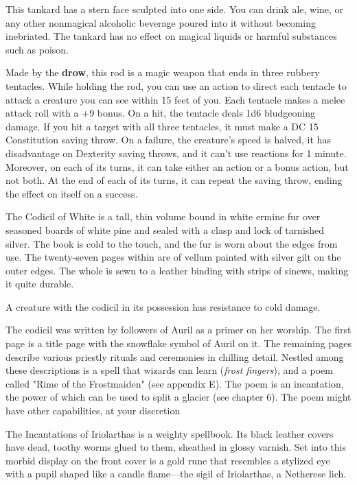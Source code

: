 \documentclass[10pt,a4paper,twoside,bg=print,twocolumn,openany,nodeprecatedcode]{dndbook}
\begin{document}
This tankard has a stern face sculpted into one side. You can drink ale, wine, or any other nonmagical alcoholic beverage poured into it without becoming inebriated. The tankard has no effect on magical liquids or harmful substances such as poison.

Made by the \textbf{drow}, this rod is a magic weapon that ends in three rubbery tentacles. While holding the rod, you can use an action to direct each tentacle to attack a creature you can see within 15 feet of you. Each tentacle makes a melee attack roll with a +9 bonus. On a hit, the tentacle deals 1d6 bludgeoning damage. If you hit a target with all three tentacles, it must make a DC 15 Constitution saving throw. On a failure, the creature's speed is halved, it has disadvantage on Dexterity saving throws, and it can't use reactions for 1 minute. Moreover, on each of its turns, it can take either an action or a bonus action, but not both. At the end of each of its turns, it can repeat the saving throw, ending the effect on itself on a success.

The Codicil of White is a tall, thin volume bound in white ermine fur over seasoned boards of white pine and sealed with a clasp and lock of tarnished silver. The book is cold to the touch, and the fur is worn about the edges from use. The twenty-seven pages within are of vellum painted with silver gilt on the outer edges. The whole is sewn to a leather binding with strips of sinews, making it quite durable.

A creature with the codicil in its possession has resistance to cold damage.

The codicil was written by followers of Auril as a primer on her worship. The first page is a title page with the snowflake symbol of Auril on it. The remaining pages describe various priestly rituals and ceremonies in chilling detail. Nestled among these descriptions is a spell that wizards can learn (\textit{frost fingers}), and a poem called "Rime of the Frostmaiden" (see appendix E). The poem is an incantation, the power of which can be used to split a glacier (see chapter 6). The poem might have other capabilities, at your discretion

The Incantations of Iriolarthas is a weighty spellbook. Its black leather covers have dead, toothy worms glued to them, sheathed in glossy varnish. Set into this morbid display on the front cover is a gold rune that resembles a stylized eye with a pupil shaped like a candle flame—the sigil of Iriolarthas, a Netherese lich.
\end{document}
